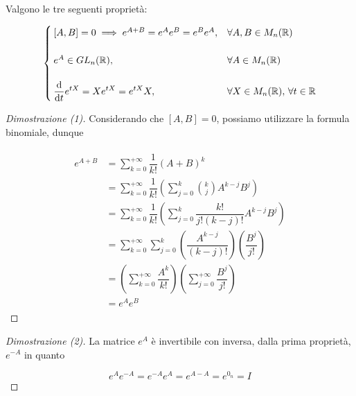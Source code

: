 Valgono le tre seguenti proprietà:

\begin{equation}
	\begin{cases}
		[A,B] = 0 \implies e^{A + B} = e^{A} e^{B} = e^{B} e^{A}, & \forall A,B \in M_{n}(\R) \\\\
		e^{A} \in GL_{n}(\R), & \forall A \in M_{n}(\R) \\\\
		\ddv{t}  e^{t X} = X e^{t X} = e^{t X} X, & \forall X\in M_{n}(\R), \, \forall t \in \R
	\end{cases}
\end{equation}

\begin{proof}[Dimostrazione (1)]
	Considerando che $ [A,B] = 0 $, possiamo utilizzare la formula binomiale, dunque
	
	\begin{align}
		\begin{split}
			e^{A + B} &= \sum_{k=0}^{+\infty} \dfrac{1}{k!} (A+B)^{k} \\
			&= \sum_{k=0}^{+\infty} \dfrac{1}{k!} \left( \sum_{j=0}^{k} \binom{k}{j} A^{k-j} B^{j} \right) \\
			&= \sum_{k=0}^{+\infty} \dfrac{1}{k!} \left( \sum_{j=0}^{k} \dfrac{k!}{j! (k-j)!} A^{k-j} B^{j} \right) \\
			&= \sum_{k=0}^{+\infty} \sum_{j=0}^{k} \left( \dfrac{A^{k-j}}{(k-j)!} \right) \left( \dfrac{B^{j}}{j!} \right) \\
			&= \left( \sum_{k=0}^{+\infty} \dfrac{A^{k}}{k!} \right) \left( \sum_{j=0}^{+\infty} \dfrac{B^{j}}{j!} \right) \\
			&= e^{A} e^{B}
		\end{split}
	\end{align}
\end{proof}

\begin{proof}[Dimostrazione (2)]
	La matrice $ e^{A} $ è invertibile con inversa, dalla prima proprietà, $ e^{-A} $ in quanto
	
	\begin{equation}
		e^{A} e^{-A} = e^{-A} e^{A} = e^{A-A} = e^{0_{n}} = I
	\end{equation}
\end{proof}

